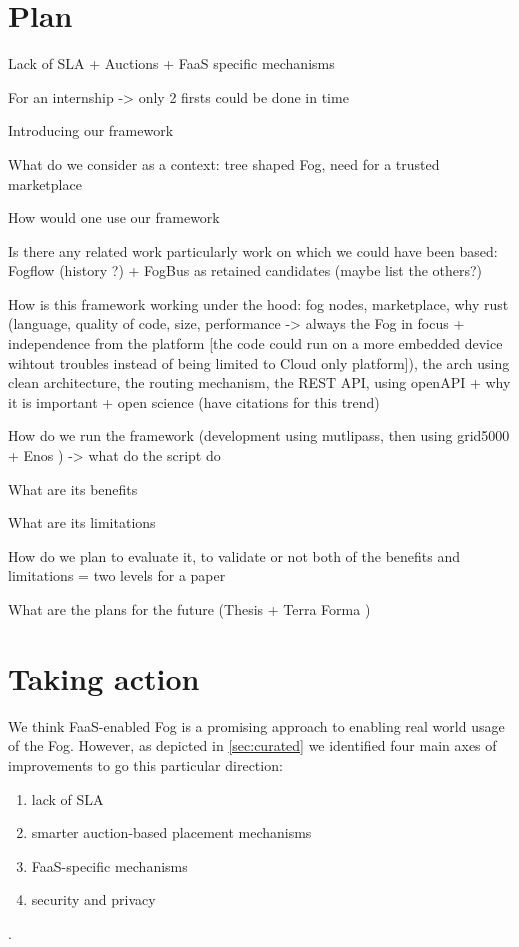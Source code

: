 \documentclass[11pt]{sdm}
\begin{document}
\section{Plan}

Lack of SLA + Auctions + FaaS specific mechanisms

For an internship -> only 2 firsts could be done in time

Introducing our framework

What do we consider as a context: tree shaped Fog, need for a trusted marketplace

How would one use our framework

Is there any related work particularly work on which we could have been based: Fogflow \cite{smartfog_fogflow_2022} (history ?) + FogBus \cite{deng_fogbus2_2021} as retained candidates (maybe list the others?)

How is this framework working under the hood: fog nodes, marketplace, why rust (language, quality of code, size, performance -> always the Fog in focus + independence from the platform [the code could run on a more embedded device wihtout troubles instead of being limited to Cloud only platform]), the arch using clean architecture, the routing mechanism, the REST \gls{API}, using openAPI + why it is important + open science (have citations for this trend)

How do we run the framework (development using mutlipass, then using grid5000 + Enos \cite{cherrueau_enoslib_2022}) -> what do the script do

What are its benefits

What are its limitations

How do we plan to evaluate it, to validate or not both of the benefits and limitations = two levels for a paper

What are the plans for the future (Thesis + Terra Forma \cite{longuevergne_terra_2022})

\section{Taking action}

We think \gls{FaaS}-enabled Fog is a promising approach to enabling real world usage of the Fog. However, as depicted in \ref{sec:curated} we identified four main axes of improvements to go this particular direction:
\begin{enumerate}
	\item lack of \gls{SLA}
	\item smarter auction-based placement mechanisms
	\item \gls{FaaS}-specific mechanisms
	\item security and privacy
\end{enumerate}.
\end{document}
